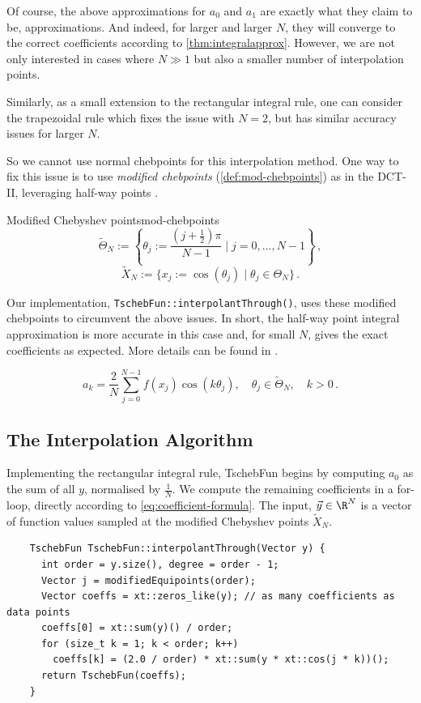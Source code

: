 \documentclass[12pt, a4paper]{article}
\begin{document}
  Of course, the above approximations for $a_0$ and $a_1$ are exactly what they claim to be, approximations.
  And indeed, for larger and larger $N$, they will converge to the correct coefficients according to \cref{thm:integralapprox}.
  However, we are not only interested in cases where $N \gg 1$ but also a smaller number of interpolation points.

  Similarly, as a small extension to the rectangular integral rule, one can consider the trapezoidal rule which fixes the issue with $N = 2$, but has similar accuracy issues for larger $N$.

  So we cannot use normal chebpoints for this interpolation method.
  One way to fix this issue is to use \emph{modified chebpoints} (\cref{def:mod-chebpoints}) as in the DCT-II, leveraging half-way points \parencite{CombTrig}.

  \begin{definition}{Modified Chebyshev points}{mod-chebpoints}
    $$\tilde{\Theta}_N := \left\{\theta_j := \frac{(j + \frac{1}{2})\pi}{N-1} \;\bigg|\; j = 0, ..., N-1\right\} \,,$$
    $$\tilde{X}_N := \{x_j := \cos(\theta_j) \;|\; \theta_j \in \Theta_N\} \,.$$
  \end{definition}

  Our implementation, \texttt{\textcolor{themecolor3}{TschebFun}::\textcolor{themecolor2}{interpolantThrough}()}, uses these modified chebpoints to circumvent the above issues.
  In short, the half-way point integral approximation is more accurate in this case and, for small $N$, gives the exact coefficients as expected.
  More details can be found in \cite{CombTrig}.

  \begin{equation}
    a_k = \frac{2}{N} \sum_{j=0}^{N-1} f(x_j) \cos(k \theta_j), \quad \theta_j \in \tilde{\Theta}_N, \quad k > 0 \,.
    \label{eq:coefficient-formula}
  \end{equation}

  \subsection{The Interpolation Algorithm}
  Implementing the rectangular integral rule, \textcolor{themecolor3}{TschebFun} begins by computing $a_0$ as the sum of all $y$, normalised by $\frac{1}{N}$.
  We compute the remaining coefficients in a for-loop, directly according to \cref{eq:coefficient-formula}.
  The input, $\vec{y} \in \R^N$ is a vector of function values sampled at the modified Chebyshev points $\tilde{X}_N$.
  \begin{verbatim}
    TschebFun TschebFun::interpolantThrough(Vector y) {
      int order = y.size(), degree = order - 1;
      Vector j = modifiedEquipoints(order);
      Vector coeffs = xt::zeros_like(y); // as many coefficients as data points
      coeffs[0] = xt::sum(y)() / order;
      for (size_t k = 1; k < order; k++)
        coeffs[k] = (2.0 / order) * xt::sum(y * xt::cos(j * k))();
      return TschebFun(coeffs);
    }
  \end{verbatim}
\end{document}
